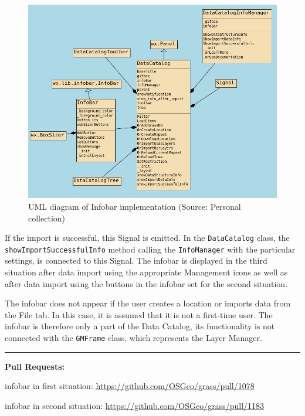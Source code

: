 \documentclass[a4paper,10pt,twoside]{article}
\begin{document}
\vspace{0.3cm}
\begin{figure}[hbt!] 
\begin{center}
\includegraphics[width=17cm]{../pictures/uml_chart.png} 
\caption[UML diagram of Infobar implementation]{UML diagram of Infobar implementation (Source: Personal collection)}
\label{fig:uml_chart}
\end{center}
\end{figure}

\noindent If the import is successful, this Signal is emitted. In the
\texttt{DataCatalog} class, the \texttt{showImportSuccessfulInfo}
method calling the \texttt{InfoManager} with the particular settings,
is connected to this Signal. The infobar is displayed in the third
situation after data import using the appropriate Management icons as
well as after data import using the buttons in the infobar set for
the second situation.

\newpage
\noindent The infobar does not appear if the user creates a location or imports
data from the File tab. In this case, it is assumed that it is not a
first-time user. The infobar is therefore only a part of the Data
Catalog, its functionality is not connected with the \texttt{GMFrame}
class, which represents the Layer Manager.

\par\noindent\rule{\textwidth}{0.4pt}
\noindent \textbf{Pull Requests:}

infobar in first situation: \url{https://github.com/OSGeo/grass/pull/1078}

infobar in second situation: \url{https://github.com/OSGeo/grass/pull/1183}
\end{document}
